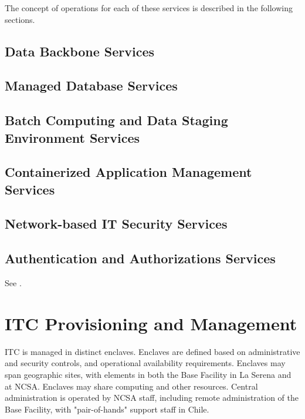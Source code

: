 The concept of operations for each of these services is described in the 
following sections.

\subsection{Data Backbone Services}


\subsection{Managed Database Services}


\subsection{Batch Computing and Data Staging Environment Services}


\subsection{Containerized Application Management Services}


\subsection{Network-based IT Security Services}


\subsection{Authentication and Authorizations Services}
See .

\section{ITC Provisioning and Management}

ITC is managed in distinct enclaves. Enclaves are defined based on administrative 
and security controls, and operational availability requirements. Enclaves may 
span geographic sites, with elements in both the Base Facility in La Serena and 
at NCSA. Enclaves may share computing and other resources. Central administration 
is operated by NCSA staff, including remote administration of the Base Facility, 
with "pair-of-hands" support staff in Chile.

